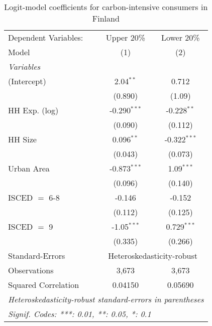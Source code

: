 
\begin{table}[htbp!]
   \centering
   \small
   \begin{adjustbox}{width = 1\textwidth, max height = 0.95\textheight, center}
      \begin{threeparttable}[b]
         \caption{\label{tab:Logit_1_FIN} Logit-model coefficients for carbon-intensive consumers in Finland}
         \begin{tabular}{lcc}
            \tabularnewline \midrule \midrule
            Dependent Variables: & Upper 20\%     & Lower 20\%\\   
            Model                & (1)            & (2)\\  
            \midrule
            \emph{Variables}\\
            (Intercept)          & 2.04$^{**}$    & 0.712\\   
                                 & (0.890)        & (1.09)\\   
            HH Exp. (log)        & -0.290$^{***}$ & -0.228$^{**}$\\   
                                 & (0.090)        & (0.112)\\   
            HH Size              & 0.096$^{**}$   & -0.322$^{***}$\\   
                                 & (0.043)        & (0.073)\\   
            Urban Area           & -0.873$^{***}$ & 1.09$^{***}$\\   
                                 & (0.096)        & (0.140)\\   
            ISCED $=$ 6-8        & -0.146         & -0.152\\   
                                 & (0.112)        & (0.125)\\   
            ISCED $=$ 9          & -1.05$^{***}$  & 0.729$^{***}$\\   
                                 & (0.335)        & (0.266)\\   
            \midrule 
            Standard-Errors & \multicolumn{2}{c}{Heteroskedasticity-robust} \\ 
            Observations         & 3,673          & 3,673\\  
            Squared Correlation  & 0.04150        & 0.05690\\  
            \midrule \midrule
            \multicolumn{3}{l}{\emph{Heteroskedasticity-robust standard-errors in parentheses}}\\
            \multicolumn{3}{l}{\emph{Signif. Codes: ***: 0.01, **: 0.05, *: 0.1}}\\
         \end{tabular}
         

\end{threeparttable}
\end{adjustbox}
\end{table}
